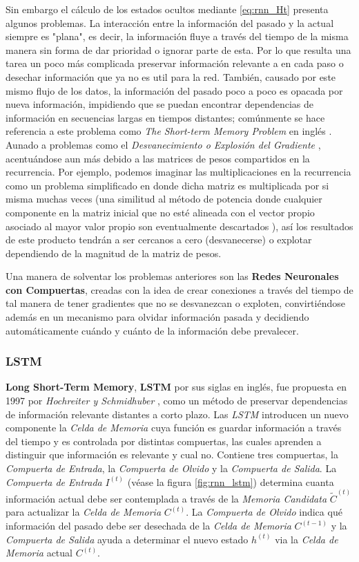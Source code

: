 Sin embargo el cálculo de los estados ocultos mediante \ref{eq:rnn_Ht} presenta algunos problemas.
La interacción entre la información del pasado y la actual siempre es "plana", es decir, la información
fluye a través del tiempo de la misma manera sin forma de dar prioridad o ignorar parte de
esta. Por lo que resulta una tarea un poco más complicada preservar información relevante a en cada paso
o desechar información que ya no es util para la red. También, causado por este mismo flujo de los
datos, la información del pasado poco a poco es opacada por nueva información, impidiendo que se
puedan encontrar dependencias de información en secuencias largas en tiempos distantes;
comúnmente se hace referencia a este problema como \textit{The Short-term Memory Problem} en inglés
\cite{VanishinGradient2}.
Aunado a problemas como el
\textit{Desvanecimiento o Explosión del Gradiente} \cite{VanishinGradient} \cite{pmlr-v28-pascanu13},
acentuándose aun más
debido a las matrices de pesos compartidos en la recurrencia. Por ejemplo, podemos imaginar las
multiplicaciones en la recurrencia como un problema simplificado en donde dicha matriz es
multiplicada por si misma muchas veces (una similitud al método de potencia donde cualquier
componente en la matriz inicial que no esté alineada con el vector propio asociado al mayor valor
propio son eventualmente descartados \cite[pp.~390-392]{GoodBengCour16}), así los resultados de este producto
tendrán a ser cercanos a cero (desvanecerse) o explotar dependiendo de la magnitud de la matriz de pesos.

Una manera de solventar los problemas anteriores son las \textbf{Redes Neuronales con Compuertas},
creadas con la idea de crear conexiones a través del tiempo de tal manera de tener gradientes que no
se desvanezcan o exploten, convirtiéndose además en un mecanismo para olvidar información pasada y
decidiendo automáticamente cuándo y cuánto de la información debe prevalecer.

\subsubsection{LSTM}

\textbf{Long Short-Term Memory}, \textbf{LSTM} por sus siglas en inglés, fue propuesta en 1997 por
\textit{Hochreiter y Schmidhuber} \cite{LSTM}, como un método de preservar dependencias de información relevante
distantes a corto plazo. Las \textit{LSTM} introducen un nuevo componente la
\textit{Celda de Memoria} cuya función es guardar información a través del tiempo y es
controlada por distintas compuertas, las cuales aprenden a distinguir que información es relevante y
cual no. Contiene tres compuertas, la \textit{Compuerta de Entrada}, la \textit{Compuerta de Olvido}
y la \textit{Compuerta de Salida}. La \textit{Compuerta de Entrada} $I^{(t)}$ (véase la figura
\ref{fig:rnn_lstm}) determina cuanta información actual debe ser contemplada a través de la
\textit{Memoria Candidata} $\tilde C^{(t)}$ para actualizar la \textit{Celda de Memoria} $C^{(t)}$.
La \textit{Compuerta de Olvido} indica qué información del pasado debe ser desechada de la
\textit{Celda de Memoria} $C^{(t-1)}$ y la \textit{Compuerta de Salida} ayuda a determinar el nuevo
estado $h^{(t)}$ via la \textit{Celda de Memoria} actual $C^{(t)}$.


